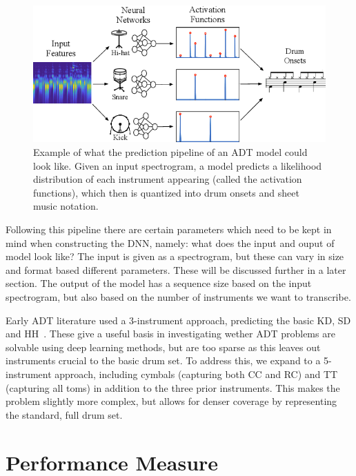 \begin{figure}[H]
    \centering
    \includegraphics[scale=0.7]{figures/adtpipeline.png}
    \caption{Example of what the prediction pipeline of an \gls{ADT} model could look like. Given an input spectrogram, a model predicts a likelihood distribution of each instrument appearing (called the activation functions), which then is quantized into drum onsets and sheet music notation.}
    \label{ADTFigure}
\end{figure}

Following this pipeline there are certain parameters which need to be kept in mind when constructing the \gls{DNN}, namely: what does the input and ouput of model look like? The input is given as a spectrogram, but these can vary in size and format based different parameters. These will be discussed further in a later section. The output of the model has a sequence size based on the input spectrogram, but also based on the number of instruments we want to transcribe.

Early \gls{ADT} literature used a 3-instrument approach, predicting the basic \acrfull{KD}, \acrfull{SD} and \acrfull{HH}~\cite{vogl2016recurrent}. These give a useful basis in investigating wether \gls{ADT} problems are solvable using deep learning methods, but are too sparse as this leaves out instruments crucial to the basic drum set. To address this, we expand to a 5-instrument approach, including cymbals (capturing both \acrfull{CC} and \acrfull{RC}) and \acrfull{TT} (capturing all toms) in addition to the three prior instruments. This makes the problem slightly more complex, but allows for denser coverage by representing the standard, full drum set.


\section{Performance Measure}

